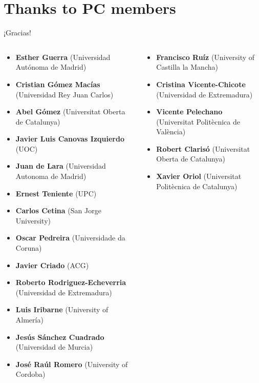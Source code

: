 

\section{Thanks to PC members}

\begin{frame}{¡Gracias!}

{\scriptsize
\begin{columns}
  \begin{column}{0.5\textwidth}
    \begin{itemize}
  \item {\bf Esther Guerra} (Universidad Autónoma de Madrid)
  \item {\bf Cristian Gómez Macías} (Universidad Rey Juan Carlos)
  \item {\bf Abel Gómez} (Universitat Oberta de Catalunya)
  \item {\bf Javier Luis Canovas Izquierdo} (UOC)
  \item {\bf Juan de Lara} (Universidad Autonoma de Madrid)
  \item {\bf Ernest Teniente} (UPC)
  \item {\bf Carlos Cetina} (San Jorge University)
  \item {\bf Oscar Pedreira} (Universidade da Coruna)
  \item {\bf Javier Criado} (ACG)
  \item {\bf Roberto Rodriguez-Echeverria} (Universidad de Extremadura)
  \item {\bf Luis Iribarne} (University of Almería)
  \item {\bf Jesús Sánchez Cuadrado} (Universidad de Murcia)
  \item {\bf José Raúl Romero} (University of Cordoba)
    \end{itemize}
  \end{column}
  \begin{column}{0.5\textwidth}
    \begin{itemize}
  \item {\bf Francisco Ruíz} (University of Castilla la Mancha)
  \item {\bf Cristina Vicente-Chicote} (Universidad de Extremadura)
  \item {\bf Vicente Pelechano} (Universitat Politècnica de València)
  \item {\bf Robert Clarisó} (Universitat Oberta de Catalunya)
  \item {\bf Xavier Oriol} (Universitat Politècnica de Catalunya)

\end{itemize}
\end{column}
\end{columns}}
\end{frame}
